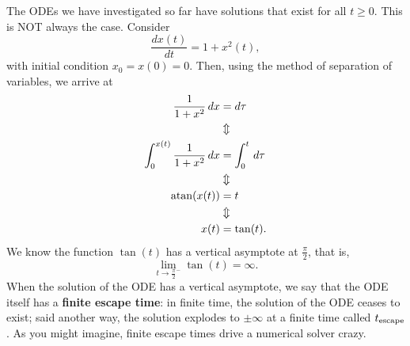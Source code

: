 The ODEs we have investigated so far have solutions that exist for all $t\ge 0$. This is NOT always the case. Consider 
\begin{equation}
    \frac{dx(t)}{dt} = 1 + x^2(t),
\end{equation}
with initial condition $x_0 = x(0)=0$. Then, using the method of separation of variables, we arrive at
\begin{align*} 
\frac{1}{1+x^2}\, dx &= d \tau \\
  & \Updownarrow   \\
\int_0^{x(t)}\frac{1}{1+x^2}\, dx &= \int_0^t \, d\tau \\
  & \Updownarrow   \\
\mathrm{atan}(x(t)) &= t \\
    & \Updownarrow   \\
    x(t) &= \tan(t).
\end{align*}
We know the function $\tan(t)$ has a vertical asymptote at $\frac{\pi}{2}$, that is, 
$$\lim_{t \to\frac{\pi}{2}^-} \tan(t) = \infty.$$
When the solution of the ODE has a vertical asymptote, we say that the ODE itself has a \textbf{finite escape time}: in finite time, the solution of the ODE ceases to exist; said another way, the solution explodes to $\pm \infty$ at a finite time called $t_{\rm escape}$. As you might imagine, finite escape times drive a numerical solver crazy.

\bigskip

